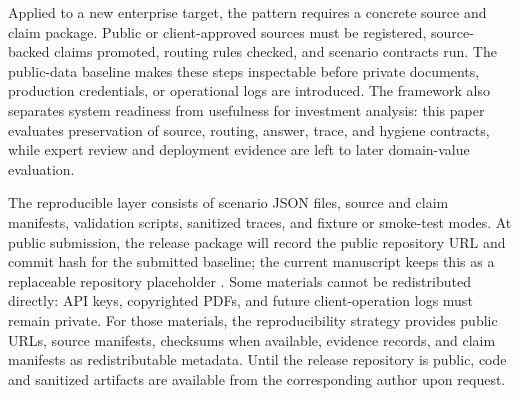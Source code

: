 Applied to a new enterprise target, the pattern requires a concrete source and claim package. Public or client-approved sources must be registered, source-backed claims promoted, routing rules checked, and scenario contracts run. The public-data baseline makes these steps inspectable before private documents, production credentials, or operational logs are introduced. The framework also separates system readiness from usefulness for investment analysis: this paper evaluates preservation of source, routing, answer, trace, and hygiene contracts, while expert review and deployment evidence are left to later domain-value evaluation.

The reproducible layer consists of scenario JSON files, source and claim manifests, validation scripts, sanitized traces, and fixture or smoke-test modes. At public submission, the release package will record the public repository URL and commit hash for the submitted baseline; the current manuscript keeps this as a replaceable repository placeholder \citep{ahnkim2026advisorrepo}. Some materials cannot be redistributed directly: API keys, copyrighted PDFs, and future client-operation logs must remain private. For those materials, the reproducibility strategy provides public URLs, source manifests, checksums when available, evidence records, and claim manifests as redistributable metadata. Until the release repository is public, code and sanitized artifacts are available from the corresponding author upon request.
